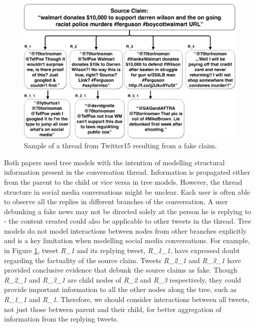 \documentclass[letterpaper]{article} %
\begin{document}
\begin{figure}[t]
\centering
    \includegraphics[width= 0.98\columnwidth]{prop_tree.pdf}
\caption{Sample of a thread from Twitter15 resulting from a fake claim.}
\label{fig:proptree}
\end{figure}

Both papers used tree models with the intention of modelling structural information present in the conversation thread. Information is propagated either from the parent to the child or vice versa in tree models. However, the thread structure in social media conversations might be unclear. Each user is often able to observe all the replies in different branches of the conversation. A user debunking a fake news may not be directed solely at the person he is replying to - the content created could also be applicable to other tweets in the thread. Tree models do not model interactions between nodes from other branches explicitly and is a key limitation when modelling social media conversations. For example, in Figure \ref{fig:proptree}, tweet \textit{R\_1} and its replying tweet, \textit{R\_1\_1}, have expressed doubt regarding the factuality of the source claim. Tweets \textit{R\_2\_1} and \textit{R\_3\_1} have provided conclusive evidence that debunk the source claims as fake. Though \textit{R\_2\_1} and \textit{R\_3\_1} are child nodes of \textit{R\_2} and \textit{R\_3} respectively, they could provide important information to all the other nodes along the tree, such as \textit{R\_1\_1} and \textit{R\_1}. Therefore, we should consider interactions between all tweets, not just those between parent and their child, for better aggregation of information from the replying tweets.
\end{document}
